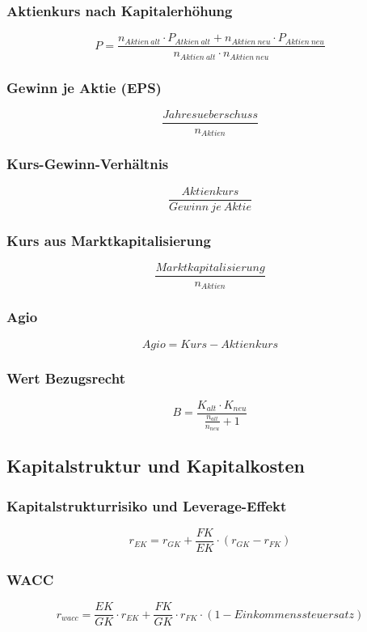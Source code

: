 \subsubsection{Aktienkurs nach Kapitalerhöhung}
\[P = \frac{n_{Aktien~alt} \cdot P_{Atkien~alt} + n_{Aktien~neu} \cdot P_{Aktien~neu}}{n_{Aktien~alt} \cdot n_{Aktien~neu}}\]

\subsubsection{Gewinn je Aktie (EPS)}
\[\frac{Jahresueberschuss}{n_{Aktien}}\]

\subsubsection{Kurs-Gewinn-Verhältnis}
\[\frac{Aktienkurs}{Gewinn~je~Aktie}\]

\subsubsection{Kurs aus Marktkapitalisierung}
\[\frac{Marktkapitalisierung}{n_{Aktien}}\]

\subsubsection{Agio}
\[Agio = Kurs - Aktienkurs\]

\subsubsection{Wert Bezugsrecht}
\[B = \frac{K_{alt} \cdot K_{neu}}{\frac{n_{alt}}{n_{neu}}+1}\]


\subsection{Kapitalstruktur und Kapitalkosten}

\subsubsection{Kapitalstrukturrisiko und Leverage-Effekt}
\[r_{EK} = r_{GK} + \frac{FK}{EK} \cdot (r_{GK} - r_{FK})\]

\subsubsection{WACC}
\[r_{wacc} = \frac{EK}{GK} \cdot r_{EK} + \frac{FK}{GK} \cdot r_{FK} \cdot (1-Einkommenssteuersatz)\]

